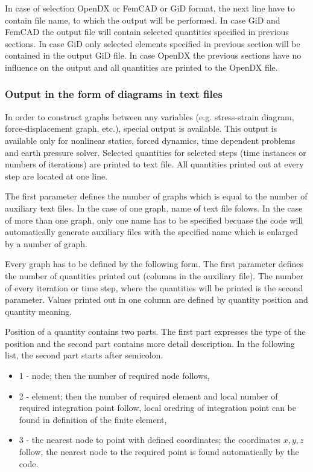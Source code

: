 In case of selection OpenDX or FemCAD or GiD format, the next line have to contain file name,
to which the output will be performed. In case GiD and FemCAD the output file will contain
selected quantities specified in previous sections. In case GiD only selected elements specified
in previous section will be contained in the output GiD file. In case OpenDX the previous sections
have no influence on the output and all quantities are printed to the OpenDX file.

\subsubsection{Output in the form of diagrams in text files}
In order to construct graphs between any variables (e.g. stress-strain diagram,
force-displacement graph, etc.), special output is available.
This output is available only for nonlinear statics, forced dynamics, time dependent problems
and earth pressure solver. Selected quantities for selected steps (time instances or numbers of iterations)
are printed to text file. All quantities printed out at every step are located at one line.

The first parameter defines the number of graphs which is equal to the number of auxiliary
text files. In the case of one graph, name of text file folows. In the case of more than one graph,
only one name has to be specified becuase the code will automatically generate auxiliary files
with the specified name which is enlarged by a number of graph.

Every graph has to be defined by the following form.
The first parameter defines the number of quantities printed out (columns in the auxiliary file).
The number of every iteration or time step, where the quantities will be printed is
the second parameter.
Values printed out in one column are defined by quantity position and quantity meaning.

Position of a quantity contains two parts. The first part expresses the type of the position and the
second part contains more detail description. In the following list, the second part starts after semicolon.
\begin{itemize}
\item[] 1 - node; then the number of required node follows,
\item[] 2 - element; then the number of required element and local number of required integration point follow,
local oredring of integration point can be found in definition of the finite element,
\item[] 3 - the nearest node to point with defined coordinates; the coordinates $x,y,z$ follow, the nearest
node to the required point is found automatically by the code.
\end{itemize}
 
